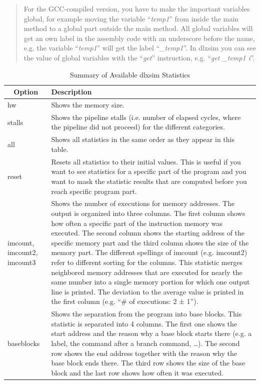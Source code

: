 \begin{quote}
For the GCC-compiled version, you have to make the important variables
global, for example moving the variable ``\emph{temp1}'' from inside the
main method to a global part outside the main method. All global
variables will get an own label in the assembly code with an underscore
before the name, e.g. the variable ``\emph{temp1}'' will get the label
``\emph{\_temp1}''. In dlxsim you can see the value of global variables
with the ``\emph{get}'' instruction, e.g. ``\emph{get \_temp1 i}''.
\end{quote}
\begin{table}[!htb]
	\centering
	\begin{tabular}{|p{2cm}|p{14cm}|}
		\hline
		\multicolumn{1}{|c|}{\textbf{Option}} & \textbf{Description}                                                               \\ \hline
		hw & Shows the memory size.\\\hline
		stalls & Shows the pipeline stalls (i.e. number of elapsed cycles, where
		the pipeline did not proceed) for the different
		categories.\\\hline
		all & Shows all statistics in the same order as they appear in this
		table.\\\hline
		reset & Resets all statistics to their initial values. This is useful if
		you want to see statistics for a specific part of the program and you
		want to mask the statistic results that are computed before you reach
		specific program part.\\\hline
		imcount, imcount2, imcount3 & 
		Shows the number of executions for memory addresses. The output is
		organized into three columns. The first column shows how often a
		specific part of the instruction memory was executed. The second column
		shows the starting address of the specific memory part and the third
		column shows the size of the memory part. The different spellings of
		imcount (e.g. imcount2) refer to different sorting for the columns. This
		statistic merges neighbored memory addresses that are executed for
		nearly the same number into a single memory portion for which one output
		line is printed. The deviation to the average value is printed in the
		first column (e.g. ``\# of executions: 2 ± 1'').\\\hline
		baseblocks & Shows the separation from the program into base blocks.
		This statistic is separated into 4 columns. The first one shows the
		start address and the reason why a base block starts there (e.g. a
		label, the command after a branch command, \ldots). The second row shows
		the end address together with the reason why the base block ends there.
		The third row shows the size of the base block and the last row shows
		how often it was executed.\\\hline
	\end{tabular}
	\caption{Summary of Available dlxsim Statistics}
	\label{fig:fig38}
\end{table}
